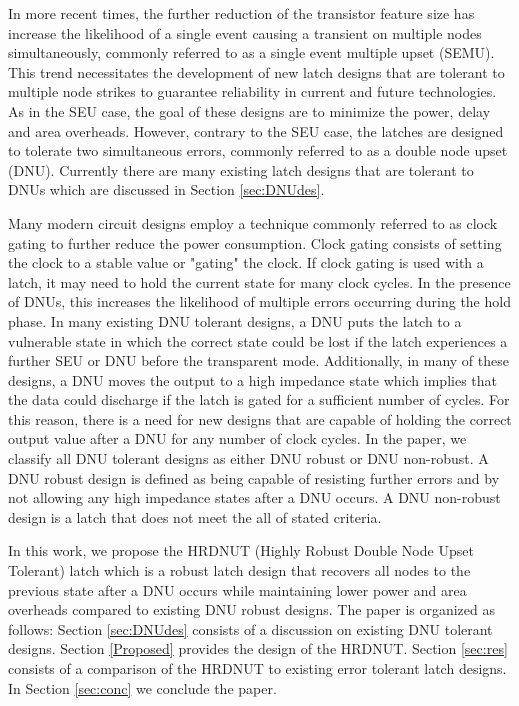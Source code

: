 In more recent times, the further reduction of the transistor feature size has increase the likelihood of a single event causing a transient on multiple nodes simultaneously, commonly referred to as a single event multiple upset (SEMU). This trend necessitates the development of new latch designs that are tolerant to multiple node strikes to guarantee reliability in current and future technologies. As in the SEU case, the goal of these designs are to minimize the power, delay and area overheads. However, contrary to the SEU case, the latches are designed to tolerate two simultaneous errors, commonly referred to as a double node upset (DNU). Currently there are many existing latch designs that are tolerant to DNUs which are discussed in Section \ref{sec:DNUdes}.   

Many modern circuit designs employ a technique commonly referred to as clock gating to further reduce the power consumption. Clock gating consists of setting the clock to a stable value or "gating" the clock. If clock gating is used with a latch, it may need to hold the current state for many clock cycles. In the presence of DNUs, this increases the likelihood of multiple errors occurring during the hold phase. In many existing DNU tolerant designs, a DNU puts the latch to a vulnerable state in which the correct state could be lost if the latch experiences a further SEU or DNU before the transparent mode. Additionally, in many of these designs, a DNU moves the output to a high impedance state which implies that the data could discharge if the latch is gated for a sufficient number of cycles. For this reason, there is a need for new designs that are capable of holding the correct output value after a DNU for any number of clock cycles. In the paper, we classify all DNU tolerant designs as either DNU robust or DNU non-robust. A DNU robust design is defined as being capable of resisting further errors and by not allowing any high impedance states after a DNU occurs. A DNU non-robust design is a latch that does not meet the all of stated criteria.

In this work, we propose the HRDNUT (Highly Robust Double Node Upset Tolerant) latch which is a robust latch design that recovers all nodes to the previous state after a DNU occurs while maintaining lower power and area overheads compared to existing DNU robust designs. The paper is organized as follows: Section \ref{sec:DNUdes} consists of a discussion on existing DNU tolerant designs. Section \ref{Proposed} provides the design of the HRDNUT. Section \ref{sec:res} consists of a comparison of the HRDNUT to existing error tolerant latch designs. In Section \ref{sec:conc} we conclude the paper.